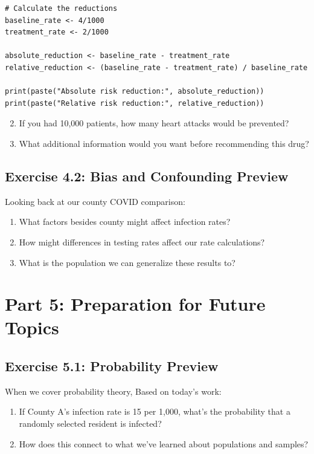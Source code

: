 \documentclass[11pt]{article}
\begin{document}
\begin{lstlisting}
# Calculate the reductions
baseline_rate <- 4/1000
treatment_rate <- 2/1000

absolute_reduction <- baseline_rate - treatment_rate
relative_reduction <- (baseline_rate - treatment_rate) / baseline_rate

print(paste("Absolute risk reduction:", absolute_reduction))
print(paste("Relative risk reduction:", relative_reduction))
\end{lstlisting}

\begin{enumerate}
\setcounter{enumi}{1}
\item If you had 10,000 patients, how many heart attacks would be prevented?
\item What additional information would you want before recommending this drug?
\end{enumerate}

\subsection{Exercise 4.2: Bias and Confounding Preview}

Looking back at our county COVID comparison:
\begin{enumerate}
\item What factors besides county might affect infection rates?
\item How might differences in testing rates affect our rate calculations?
\item What is the population we can generalize these results to?
\end{enumerate}

\section{Part 5: Preparation for Future Topics}

\subsection{Exercise 5.1: Probability Preview}

When we cover probability theory, Based on today's work:

\begin{enumerate}
\item If County A's infection rate is 15 per 1,000, what's the probability that a randomly selected resident is infected?

\item How does this connect to what we've learned about populations and samples?
\end{enumerate}
\end{document}
